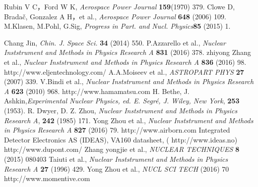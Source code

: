 \documentclass[preprint]{elsarticle}
\begin{document}
\begin{thebibliography}{99}

 Rubin V C，Ford W K, {\it Aerospace Power Journal} {\bf 159}(1970) 379.
	Clowe D, Bradač, Gonzalez A H，et al., {\it Aerospace Power Journal} {\bf 648} (2006) 109.
 M.Klasen, M.Pohl, G.Sig, {\it Progress in Part. and Nucl. Physics}{\bf 85} (2015) 1.

 Chang Jin, {\it Chin. J. Space Sci.} {\bf 34} (2014) 550.
 P.Azzarello et al., {\it Nuclear Inststrument and Methods in Physics Research A} {\bf 831} (2016) 378.
 zhiyong Zhang et al., {\it Nuclear Inststrument and Methods in Physics Research A} {\bf 836} (2016) 98.
 http://www.eljentechnology.com/
 A.A.Moiseev et al., {\it ASTROPART PHYS} {\bf 27} (2007) 339.
 V.Bindi et al., {\it Nuclear Inststrument and Methods in Physics Research A} {\bf 623} (2010) 968.
 http://www.hamamatsu.com
 H. Bethe, J. Ashkin,{\it Experimental Nuclear Physics, ed. E. Segré, J. Wiley, New York}, {\bf 253} (1953).
 R. Dwyer, D. Z. Zhou, {\it Nuclear Inststrument and Methods in Physics Research A}, {\bf 242} (1985) 171.
 Yong Zhou et al., {\it Nuclear Inststrument and Methods in Physics Research A} {\bf 827} (2016) 79.
http://www.airborn.com
 Integrated Detector Electronics AS (IDEAS), VA160 datasheet, ( http://www.ideas.no)
 http://www.dupont.com/
 Zhang yongjie et al., {\it NUCLEAR TECHNIQUES} {\bf 8} (2015) 080403
 Taiuti et al., {\it Nuclear Inststrument and Methods in Physics Research A} {\bf 27} (1996) 429.
 Yong Zhou et al., {\it NUCL SCI TECH} {\bf} (2016) 70
 http://www.momentive.com

\end{thebibliography}
\end{document}
